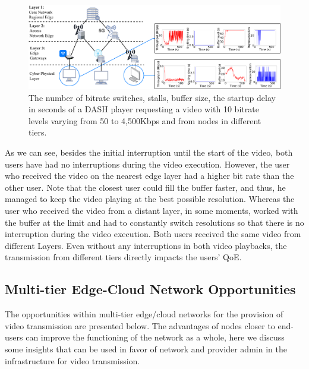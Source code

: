 \begin{figure}
    \centering
    \includegraphics[width=\linewidth]{images/qoe-multi-level-3.pdf}
    \caption{The number of bitrate switches, stalls, buffer size, the startup delay in seconds of a DASH player requesting a video with 10 bitrate levels varying from 50 to 4,500Kbps and from nodes in different tiers.}
    \label{fig:impact-two-layers}
\end{figure}


As we can see, besides the initial interruption until the start of the video, both users have had no interruptions during the video execution. However, the user who received the video on the nearest edge layer had a higher bit rate than the other user. 
Note that the closest user could fill the buffer faster, and thus, he managed to keep the video playing at the best possible resolution.
Whereas the user who received the video from a distant layer, in some moments, worked with the buffer at the limit and had to constantly switch resolutions so that there is no interruption during the video execution. 
Both users received the same video from different Layers. Even without any interruptions in both video playbacks, the transmission from different tiers directly impacts the users' QoE.


\subsection{Multi-tier Edge-Cloud Network Opportunities}

The opportunities within multi-tier edge/cloud networks for the provision of video transmission are presented below. The advantages of nodes closer to end-users can improve the functioning of the network as a whole, here we discuss some insights that can be used in favor of network and provider admin in the infrastructure for video transmission.


